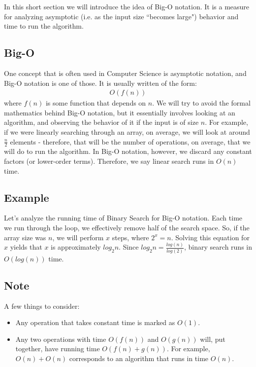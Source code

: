 %
In this short section we will introduce the idea of Big-O notation. It is a measure for analyzing asymptotic (i.e. as the input size ``becomes large") behavior and time to run the algorithm.

\subsection{Big-O}
One concept that is often used in Computer Science is asymptotic notation, and Big-O notation is one of those. It is usually written of the form:
\begin{align*}
O(f(n))
\end{align*}
where $f(n)$ is some function that depends on $n$. We will try to avoid the formal mathematics behind Big-O notation, but it essentially involves looking at an algorithm, and observing the behavior of it if the input is of size $n$. For example, if we were linearly searching through an array, on average, we will look at around $\frac{n}{2}$ elements - therefore, that will be the number of operations, on average, that we will do to run the algorithm. In Big-O notation, however, we discard any constant factors (or lower-order terms). Therefore, we say linear search runs in $O(n)$ time.

\subsection{Example}
Let's analyze the running time of Binary Search for Big-O notation. Each time we run through the loop, we effectively remove half of the search space. So, if the array size was $n$, we will perform $x$ steps, where $2^x = n$. Solving this equation for $x$ yields that $x$ is approximately $log_2{n}$. Since $log_2{n} = \frac{log(n)}{log(2)}$, binary search runs in $O(log(n))$ time.

\subsection{Note}
A few things to consider:
\begin{itemize}
\item Any operation that takes constant time is marked as $O(1)$.
\item Any two operations with time $O(f(n))$ and $O(g(n))$ will, put together, have running time $O(f(n) + g(n))$. For example, $O(n) + O(n)$ corresponds to an algorithm that runs in time $O(n)$.
\end{itemize}

